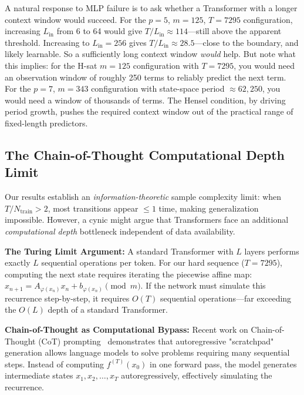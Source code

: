 \documentclass[11pt]{article}
\theoremstyle{plain}
\theoremstyle{definition}
\begin{document}
A natural response to MLP failure is to ask whether a Transformer with a longer context window would succeed. For the $p=5$, $m=125$, $T=7295$ configuration, increasing $L_{\mathrm{in}}$ from 6 to 64 would give $T/L_{\mathrm{in}} \approx 114$---still above the apparent threshold. Increasing to $L_{\mathrm{in}} = 256$ gives $T/L_{\mathrm{in}} \approx 28.5$---close to the boundary, and likely learnable. So a sufficiently long context window \emph{would} help. But note what this implies: for the H-sat $m=125$ configuration with $T = 7295$, you would need an observation window of roughly 250 terms to reliably predict the next term. For the $p=7$, $m=343$ configuration with state-space period $\approx 62{,}250$, you would need a window of thousands of terms. The Hensel condition, by driving period growth, pushes the required context window out of the practical range of fixed-length predictors.

\subsection{The Chain-of-Thought Computational Depth Limit}

Our results establish an \emph{information-theoretic} sample complexity limit: when $T/N_{\mathrm{train}} > 2$, most transitions appear $\leq 1$ time, making generalization impossible. However, a cynic might argue that Transformers face an additional \emph{computational depth} bottleneck independent of data availability.

\textbf{The Turing Limit Argument:} A standard Transformer with $L$ layers performs exactly $L$ sequential operations per token. For our hard sequence ($T=7295$), computing the next state requires iterating the piecewise affine map: $x_{n+1} = A_{\varphi(x_n)} x_n + b_{\varphi(x_n)} \pmod{m}$. If the network must simulate this recurrence step-by-step, it requires $O(T)$ sequential operations---far exceeding the $O(L)$ depth of a standard Transformer.

\textbf{Chain-of-Thought as Computational Bypass:} Recent work on Chain-of-Thought (CoT) prompting~\citep{Wei2022} demonstrates that autoregressive "scratchpad" generation allows language models to solve problems requiring many sequential steps. Instead of computing $f^{(T)}(x_0)$ in one forward pass, the model generates intermediate states $x_1, x_2, \ldots, x_T$ autoregressively, effectively simulating the recurrence.
\end{document}
